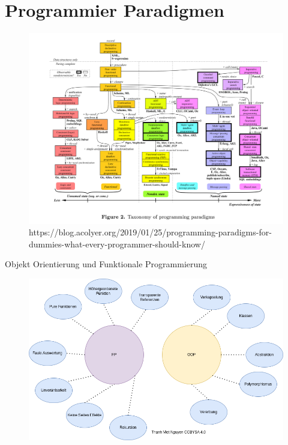 \documentclass{beamer}
\begin{document}
\section{Programmier Paradigmen}
\begin{frame}
	\begin{figure}
	    \centering
	    \includegraphics[width=0.9\linewidth]{bilder/Programming-paradigms.png}
	    \textmd{ \tiny https://blog.acolyer.org/2019/01/25/programming-paradigms-for-dummies-what-every-programmer-should-know/}
	\end{figure}
\end{frame}

\begin{frame}{Objekt Orientierung und Funktionale Programmierung}
\begin{figure}
    \centering
    \includegraphics[scale=0.38]{bilder/FPundOOP.drawio.png}
\end{figure}
\end{frame}
\end{document}
